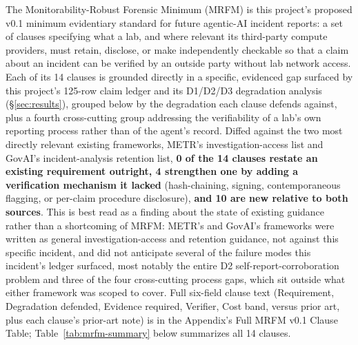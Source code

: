\documentclass[10pt]{article}
\begin{document}
The Monitorability-Robust Forensic Minimum (MRFM) is this project's proposed
v0.1 minimum evidentiary standard for future agentic-AI incident reports: a
set of clauses specifying what a lab, and where relevant its third-party
compute providers, must retain, disclose, or make independently checkable so
that a claim about an incident can be verified by an outside party without
lab network access. Each of its 14 clauses is grounded directly in a
specific, evidenced gap surfaced by this project's 125-row claim ledger and
its D1/D2/D3 degradation analysis (\S\ref{sec:results}), grouped below by the
degradation each clause defends against, plus a fourth cross-cutting group
addressing the verifiability of a lab's own reporting process rather than
of the agent's record. Diffed against the two most directly relevant
existing frameworks, METR's investigation-access list and GovAI's
incident-analysis retention list, \textbf{0 of the 14 clauses restate an
existing requirement outright, 4 strengthen one by adding a verification
mechanism it lacked} (hash-chaining, signing, contemporaneous flagging, or
per-claim procedure disclosure), \textbf{and 10 are new relative to both
sources}. This is best read as a finding about the state of existing
guidance rather than a shortcoming of MRFM: METR's and GovAI's frameworks
were written as general investigation-access and retention guidance, not
against this specific incident, and did not anticipate several of the
failure modes this incident's ledger surfaced, most notably the entire D2
self-report-corroboration problem and three of the four cross-cutting
process gaps, which sit outside what either framework was scoped to cover.
Full six-field clause text (Requirement, Degradation defended, Evidence
required, Verifier, Cost band, versus prior art, plus each clause's
prior-art note) is in the Appendix's Full MRFM v0.1 Clause Table;
Table~\ref{tab:mrfm-summary} below summarizes all 14 clauses.
\end{document}
